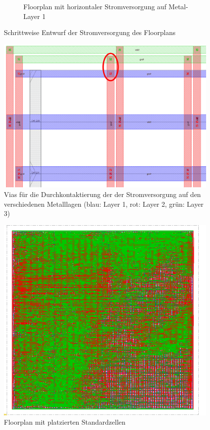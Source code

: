 \begin{figure}
\begin{subfigure}[b]{0.475\textwidth}
            \caption{{\small Floorplan mit horizontaler Stromversorgung auf Metal-Layer 1}}    
            \label{pic:floorplan4}
        \end{subfigure}
        \caption{Schrittweise Entwurf der Stromversorgung des Floorplans} 
        \label{fig:floorplanSpannungsversorgung}
    \end{figure}

    
    \begin{figure}[ht!]
     \centering
     \includegraphics[width=0.98\textwidth]{img/DFT_FLOORPLAN/CROPPED_IMG/Vias.png}
     \caption{Vias für die Durchkontaktierung der der Stromversorgung auf den verschiedenen Metalllagen (blau: Layer 1, rot: Layer 2, grün: Layer 3)}
     \label{pic:floorplanVias}
    \end{figure}
    
    
    \begin{figure}[ht!]
     \centering
     \includegraphics[width=0.98\textwidth]{img/DFT_FLOORPLAN/CROPPED_IMG/FP_5.png}
     \caption{Floorplan mit platzierten Standardzellen}
     \label{pic:floorplan1Standardzellen}
    \end{figure}

